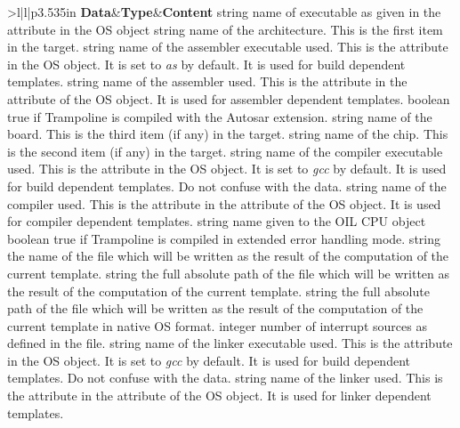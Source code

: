 \begin{sortedtable}{>{\va}l|l|p{3.535in}}
{\bf Data}&{\bf Type}&{\bf Content}
{string}
{name of executable as given in the  attribute in the OS object} 
{string}
{name of the architecture. This is the first item in the target.} 
{string}
{name of the assembler executable used. This is the  attribute in the OS object. It is set to {\em as} by default. It is used for build dependent templates.} 
{string}
{name of the assembler used. This is the  attribute in the  attribute of the OS object. It is used for assembler dependent templates.} 
{boolean}
{true if Trampoline is compiled with the Autosar extension.} 
{string}
{name of the board. This is the third item (if any) in the target.} 
{string}
{name of the chip. This is the second item (if any) in the target.} 
{string}
{name of the compiler executable used. This is the  attribute in the OS object. It is set to {\em gcc} by default. It is used for build dependent templates. Do not confuse with the  data.} 
{string}
{name of the compiler used. This is the  attribute in the  attribute of the OS object. It is used for compiler dependent templates.} 
{string}
{name given to the OIL CPU object} 
{boolean}
{true if Trampoline is compiled in extended error handling mode.} 
{string}
{the name of the file which will be written as the result of the computation of the current template.} 
{string}
{the full absolute path of the file which will be written as the result of the computation of the current template.} 
{string}
{the full absolute path of the file which will be written as the result of the computation of the current template in native OS format.} 
{integer}
{number of interrupt sources as defined in the  file.} 
{string}
{name of the linker executable used. This is the  attribute in the OS object. It is set to {\em gcc} by default. It is used for build dependent templates. Do not confuse with the  data.} 
{string}
{name of the linker used. This is the  attribute in the  attribute of the OS object. It is used for linker dependent templates.} 

\end{sortedtable}
